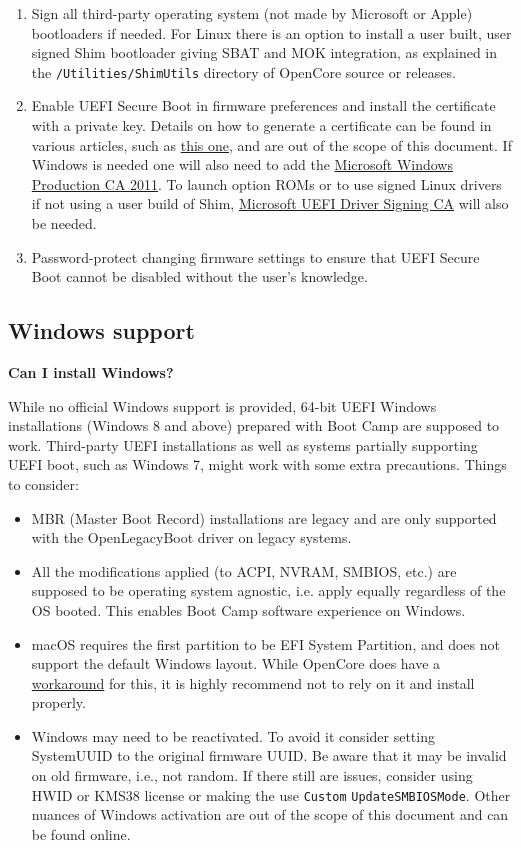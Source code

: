 \documentclass[]{article}
\begin{document}
\begin{enumerate}
\item Sign all third-party operating system (not made by Microsoft or Apple)
  bootloaders if needed. For Linux there is an option to install
  a user built, user signed Shim bootloader giving SBAT and MOK integration,
  as explained in the \texttt{/Utilities/ShimUtils} directory of OpenCore
  source or releases.
\item Enable UEFI Secure Boot in firmware preferences and install the
  certificate with a private key. Details on how to generate a certificate
  can be found in various articles, such as \href{https://habr.com/en/post/273497}{this one},
  and are out of the scope of this document. If Windows is needed one
  will also need to add the
  \href{http://go.microsoft.com/fwlink/?LinkID=321192}{Microsoft Windows Production CA 2011}.
  To launch option ROMs or to use signed Linux drivers if not using a user build of Shim,
  \href{http://go.microsoft.com/fwlink/?LinkId=321194}{Microsoft UEFI Driver Signing CA} will also be needed.
\item Password-protect changing firmware settings to ensure that UEFI Secure Boot
  cannot be disabled without the user's knowledge.
\end{enumerate}

\subsection{Windows support}\label{troubleshootingwin}

  \textbf{Can I install Windows?}

  While no official Windows support is provided, 64-bit UEFI Windows installations (Windows 8 and
  above) prepared with Boot Camp are supposed to work. Third-party UEFI installations
  as well as systems partially supporting UEFI boot, such as Windows 7, might work with
  some extra precautions. Things to consider:

  \begin{itemize}
  \item MBR (Master Boot Record) installations are legacy and are only supported
  with the OpenLegacyBoot driver on legacy systems.
  \item All the modifications applied (to ACPI, NVRAM, SMBIOS, etc.) are supposed
  to be operating system agnostic, i.e. apply equally regardless of the OS booted.
  This enables Boot Camp software experience on Windows.
  \item macOS requires the first partition to be EFI System Partition, and does
  not support the default Windows layout. While OpenCore does have a
  \href{https://github.com/acidanthera/bugtracker/issues/327}{workaround}
  for this, it is highly recommend not to rely on it and install properly.
  \item Windows may need to be reactivated. To avoid it consider
  setting SystemUUID to the original firmware UUID. Be aware that it may be invalid
  on old firmware, i.e., not random. If there still are issues,
  consider using HWID or KMS38 license or making the use \texttt{Custom}
  \texttt{UpdateSMBIOSMode}. Other nuances of Windows activation are out of the
  scope of this document and can be found online.
  \end{itemize}
\end{document}
